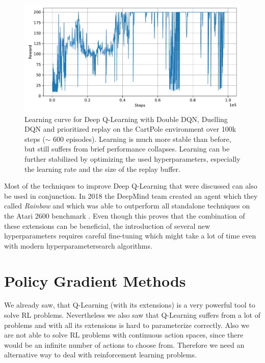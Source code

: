 \begin{figure}[t]
  
  \begin{center}
      \includegraphics[clip, width=0.8\columnwidth]{figures/rl/dqn_extensions_cart_pole_plot.pdf}
  \end{center}
  
  \caption[Learning Curve for DQN with Extensions on CartPole]{Learning curve for Deep Q-Learning with Double DQN, Duelling DQN and prioritized replay on the CartPole environment over 100k steps ($\sim$ 600 episodes). Learning is much more stable than before, but still suffers from brief performance collapses. Learning can be further stabilized by optimizing the used hyperparameters, especially the learning rate and the size of the replay buffer.}
  \label{fig:learning_curve_dqn}
\end{figure}



Most of the techniques to improve Deep Q-Learning that were discussed can also be used in conjunction. In 2018 the DeepMind team created an agent which they called \textit{Rainbow} and which was able to outperform all standalone techniques on the Atari 2600 benchmark \cite{bellemare2013arcade, hessel2018rainbow}. Even though this proves that the combination of these extensions can be beneficial, the introduction of several new hyperparameters requires careful fine-tuning which might take a lot of time even with modern hyperparametersearch algorithms. 

\section{Policy Gradient Methods} \label{sec:PGMethods}
We already saw, that Q-Learning (with its extensions) is a very powerful tool to solve RL problems. Nevertheless we also saw that Q-Learning suffers from a lot of problems and with all its extensions is hard to parameterize correctly. Also we are not able to solve RL problems with continuous action spaces, since there would be an infinite number of actions to choose from. Therefore we need an alternative way to deal with reinforcement learning problems.


